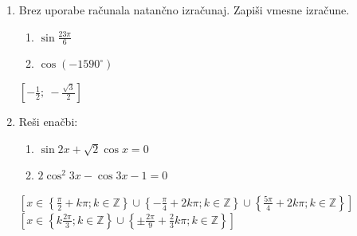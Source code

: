\documentclass[11pt,a4paper]{article}
\begin{document}
\begin{enumerate}
    \item Brez uporabe računala natančno izračunaj. Zapiši vmesne izračune.
        \begin{enumerate}
            \item $\displaystyle \sin\frac{23\pi}{6}$
            \item $\displaystyle \cos\left(-1590^\circ\right)$
        \end{enumerate}
        \begin{flushright}
            $\left[-\frac{1}{2};\ -\frac{\sqrt{3}}{2}\right]$
        \end{flushright}


    \item Reši enačbi:
        \begin{enumerate}
            \item $\displaystyle \sin{2x}+\sqrt{2}\cos x=0$
            \item $\displaystyle 2\cos^2{3x}-\cos{3x}-1=0$
        \end{enumerate}
        \begin{flushright}
            $\left[x\in \left\{\frac{\pi}{2}+k\pi;k\in\mathbb{Z}\right\}\cup\left\{-\frac{\pi}{4}+2k\pi;k\in\mathbb{Z}\right\}\cup\left\{\frac{5\pi}{4}+2k\pi;k\in\mathbb{Z}\right\} \right]$
            $\left[x\in \left\{k\frac{2\pi}{3};k\in\mathbb{Z}\right\}\cup\left\{\pm\frac{2\pi}{9}+\frac{2}{3}k\pi;k\in\mathbb{Z}\right\}\right]$
        \end{flushright}


\end{enumerate}
\end{document}
